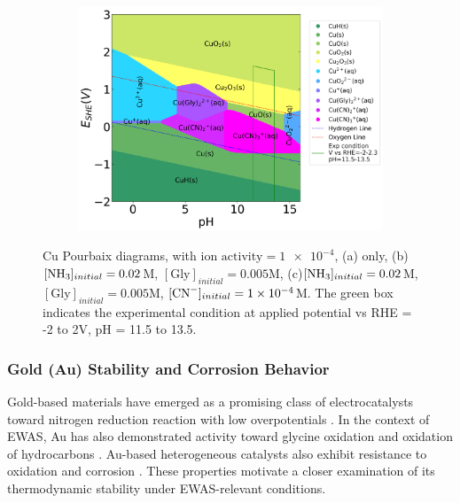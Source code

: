 \documentclass[journal=jacsat,manuscript=article]{achemso}
\begin{document}
\begin{figure}[htbp]
\begin{subfigure}[b]{0.3\textwidth}
    \end{subfigure}
    \begin{subfigure}[b]{0.3\textwidth}
        \subcaption{}\label{fig:Cu_Pourbaix_NH3_Gly_CN}
        \includegraphics[width=\textwidth]{Figures/pourbaix_diagrams/Cu-NH3-H2O_activity=1e-04_[NH3]=0.02M_[Gly]=0.005M_[CN]=0.0001.png}
    \end{subfigure}
    \caption{Cu Pourbaix diagrams, with $\text{ion activity}=\num{1e-4}$, (a) only, (b)$[\ce{NH3}]_{initial}= 0.02$M, $[\text{Gly}]_{initial}=0.005$M, (c)$[\ce{NH3}]_{initial}= 0.02$M, $[\text{Gly}]_{initial}=0.005$M,  $[\ce{CN-}]_{initial}=\num{1e-4}$M. The green box indicates the experimental condition at applied potential vs RHE = -2 to 2V, pH = 11.5 to 13.5.}
    \label{fig:Cu_Pourbaix}
\end{figure}

\subsubsection{Gold (Au) Stability and Corrosion Behavior}
Gold-based materials have emerged as a promising class of electrocatalysts toward nitrogen reduction reaction with low overpotentials \cite{Ma2021ElectroreductionGold, Shi2017AuConditions, Lee2025FavoringApproach, Bao2017ElectrochemicalCycle}. In the context of EWAS, Au has also demonstrated activity toward glycine oxidation \cite{Sandoval2011AdsorptionStudy, Chen2013AdsorptionStudy, Zou1999GoldIII-inducedGlycine} and oxidation of hydrocarbons \cite{Pina2012UpdateGold, Hughes2005TunableConditions, Scire2012SupportedCompounds}. Au-based heterogeneous catalysts also exhibit resistance to oxidation and corrosion \cite{Gong2009SurfaceGold}. These properties motivate a closer examination of its thermodynamic stability under EWAS-relevant conditions.
\end{document}
